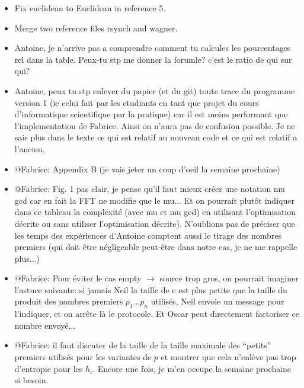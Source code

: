 \documentclass[11pt]{llncs}
\begin{document}
\begin{itemize}
\item Fix euclidean to Euclidean in reference 5.\smallskip

\item Merge two reference files rsynch and wagner.\smallskip

\item Antoine, je n'arrive pas a comprendre comment tu calcules les pourcentages rel dans la table. Peux-tu stp me donner la forumle? c'est le ratio de qui sur qui?
    
\item Antoine, peux tu stp enlever du papier (et du git) toute trace du programme version 1 (ie celui fait par les etudiants en tant que projet du cours d'informatique scientifique par la pratique) car il est moins performant que l'implementation de Fabrice. Ainsi on n'aura pas de confusion possible. Je ne sais plus dans le texte ce qui est relatif au nouveau code et ce qui est relatif a l'ancien.

\item @Fabrice: Appendix B (je vais jeter un coup d'oeil la semaine prochaine)

\item @Fabrice: Fig. 1 pas clair, je pense qu'il faut mieux créer une notation mu gcd car en fait la FFT ne modifie que le mu... Et on pourrait plut\^ot indiquer dans ce tableau la complexité (avec mu et mu gcd) en utilisant l'optimisation décrite ou sans utiliser l'optimisation décrite). N'oublions pas de préciser que les temps des expériences d'Antoine comptent aussi le tirage des nombres premiers (qui doit \^etre négligeable peut-\^etre dans notre cas, je ne me rappelle plus...)

\item @Fabrice: Pour éviter le cas empty $\rightarrow$ source trop gros, on pourrait imaginer l'astuce suivante: si jamais Neil la taille de c est plus petite que la taille du produit des nombres premiers $p_1$...$p_n$ utilisés, Neil envoie un message pour l'indiquer, et on arr\^ete là le protocole. Et Oscar peut directement factoriser ce nombre envoyé...

\item @Fabrice: il faut discuter de la taille de la taille maximale des ``petits'' premiers utilisés pour les variantes de $p$ et montrer que cela n'enlève pas trop d'entropie pour les $h_i$. Encore une fois, je m'en occupe la semaine prochaine si besoin.
\end{itemize}
\end{document}
